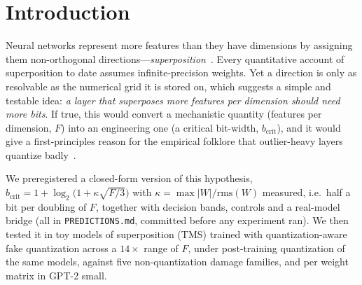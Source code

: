 \documentclass{article}
\begin{document}
\section{Introduction}

Neural networks represent more features than they have dimensions by assigning them non-orthogonal
directions---\emph{superposition}~\cite{elhage2022toy}. Every quantitative account of superposition to date
assumes infinite-precision weights. Yet a direction is only as resolvable as the numerical grid it is stored
on, which suggests a simple and testable idea: \emph{a layer that superposes more features per dimension should
need more bits}. If true, this would convert a mechanistic quantity (features per dimension, $F$) into an
engineering one (a critical bit-width, $b_{\mathrm{crit}}$), and it would give a first-principles reason for the
empirical folklore that outlier-heavy layers quantize badly~\cite{dettmers2022,xiao2023,lin2024awq}.

We preregistered a closed-form version of this hypothesis, $b_{\mathrm{crit}} = 1 + \log_2\!\big(1 + \kappa\sqrt{F/3}\big)$
with $\kappa = \max|W|/\mathrm{rms}(W)$ measured, i.e.\ half a bit per doubling of $F$, together with decision bands,
controls and a real-model bridge (all in \texttt{PREDICTIONS.md}, committed before any experiment ran). We then tested
it in toy models of superposition (TMS) trained with quantization-aware fake quantization across a $14\times$ range of
$F$, under post-training quantization of the same models, against five non-quantization damage families, and
per weight matrix in GPT-2 small.
\end{document}

